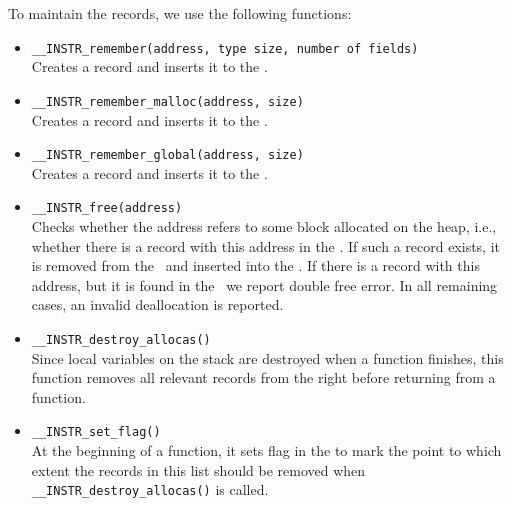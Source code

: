 To maintain the records, we use the following functions:
\begin{itemize}
  \item \texttt{\_\_INSTR\_remember(address, type size, number of fields)}
  \\Creates a record and inserts it to the \stacklist.
  \item \texttt{\_\_INSTR\_remember\_malloc(address, size)}
  \\Creates a record and inserts it to the \heaplist.
  \item \texttt{\_\_INSTR\_remember\_global(address, size)}
  \\Creates a record and inserts it to the \globalslist.
  \item \texttt{\_\_INSTR\_free(address)}
  \\Checks whether the address refers to some block allocated on the heap,
  i.e., whether there is a record with this address in the \heaplist. If such a
  record exists, it is removed from the \heaplist\ and inserted into the
  \dealloclist. If there is a record with this address, but it is found in the
  \dealloclist\, we report double free error. In all remaining cases, an invalid
  deallocation is reported.
  \item \texttt{\_\_INSTR\_destroy\_allocas()}
  \\ Since local variables on the stack are destroyed when a function
  finishes, this function removes all relevant records from the \stacklist right
  before returning from a function.
  \item \texttt{\_\_INSTR\_set\_flag()}
  \\ At the beginning of a function, it sets flag in the \stacklist to mark the
  point to which extent the records in this list should be removed when
  \texttt{\_\_INSTR\_destroy\_allocas()} is called.
\end{itemize}

